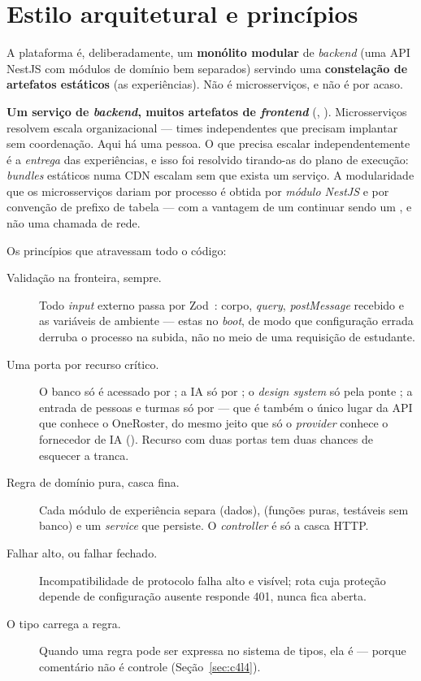 \section{Estilo arquitetural e princípios}

A plataforma é, deliberadamente, um \textbf{monólito modular} de \emph{backend}
(uma API NestJS com módulos de domínio bem separados) servindo uma
\textbf{constelação de artefatos estáticos} (as experiências). Não é
microsserviços, e não é por acaso.

\begin{decisao}
\textbf{Um serviço de \emph{backend}, muitos artefatos de \emph{frontend}}
(, ). Microsserviços resolvem escala organizacional
--- times independentes que precisam implantar sem coordenação. Aqui há uma
pessoa. O que precisa escalar independentemente é a \emph{entrega} das
experiências, e isso foi resolvido tirando-as do plano de execução:
\emph{bundles} estáticos numa CDN escalam sem que exista um serviço.
A modularidade que os microsserviços dariam por processo é obtida por
\emph{módulo NestJS} e por convenção de prefixo de tabela --- com a vantagem de
um  continuar sendo um , e não uma chamada de rede.
\end{decisao}

Os princípios que atravessam todo o código:

\begin{description}
  \item[Validação na fronteira, sempre.] Todo \emph{input} externo passa por
    Zod~\cite{zod2026}: corpo, \emph{query}, \emph{postMessage} recebido e as
    variáveis de ambiente --- estas no \emph{boot}, de modo que configuração
    errada derruba o processo na subida, não no meio de uma requisição de estudante.
  \item[Uma porta por recurso crítico.] O banco só é acessado por
    ; a IA só por ; o
    \emph{design system} só pela ponte ; a entrada de pessoas e
    turmas só por  --- que é também o único lugar da API que
    conhece o OneRoster, do mesmo jeito que só o \emph{provider} conhece o
    fornecedor de IA (). Recurso com duas portas tem duas chances de
    esquecer a tranca.
  \item[Regra de domínio pura, casca fina.] Cada módulo de experiência separa
     (dados),  (funções puras, testáveis sem
    banco) e um \emph{service} que persiste. O \emph{controller} é só a casca
    HTTP.
  \item[Falhar alto, ou falhar fechado.] Incompatibilidade de protocolo falha
    alto e visível; rota cuja proteção depende de configuração ausente responde
    401, nunca fica aberta.
  \item[O tipo carrega a regra.] Quando uma regra pode ser expressa no sistema de
    tipos, ela é --- porque comentário não é controle
    (Seção~\ref{sec:c4l4}).
\end{description}

